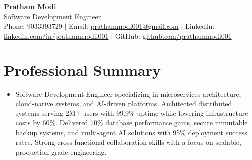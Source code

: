 \documentclass[letterpaper,10pt]{article}
\begin{document}
\begin{center}
{\Huge \textbf{Pratham Modi}} \\
\vspace{3pt}
{\large Software Development Engineer} \\
\vspace{6pt}
\small
Phone: 9033393729 $|$
Email: \href{mailto:prathammodi001@gmail.com}{prathammodi001@gmail.com} $|$
LinkedIn: \href{https://www.linkedin.com/in/prathammodii001/}{linkedin.com/in/prathammodii001} $|$
GitHub: \href{https://github.com/prathammodi001}{github.com/prathammodi001}
\end{center}

\vspace{-8pt}
\section{Professional Summary}
\begin{itemize}[leftmargin=*]
\item Software Development Engineer specializing in microservices architecture, cloud-native systems, and AI-driven platforms. Architected distributed systems serving 2M+ users with 99.9\% uptime while lowering infrastructure costs by 60\%. Delivered 70\% database performance gains, secure immutable backup systems, and multi-agent AI solutions with 95\% deployment success rates. Strong cross-functional collaboration skills with a focus on scalable, production-grade engineering.
\end{itemize}

\vspace{-6pt}
\end{document}

